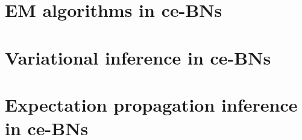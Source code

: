 \documentclass[11pt, oneside]{article}   	%
\numberwithin{figure}{section}
\numberwithin{equation}{section}
\numberwithin{table}{section}
\theoremstyle{definition}
\begin{document}
\section{EM algorithms in ce-BNs}


\section{Variational inference in ce-BNs}

\section{Expectation propagation inference in ce-BNs}
\end{document}
